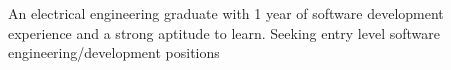 


\begin{cvparagraph}


{An electrical engineering graduate with 1 year of software development experience and a strong aptitude to learn. Seeking entry level software engineering/development positions}


\end{cvparagraph}
\vspace{-4mm}